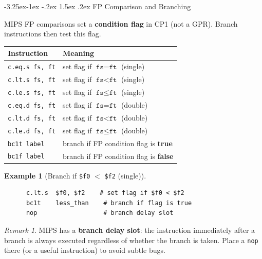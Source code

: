 \documentclass{article}
\makeatletter
\newtheorem{example}{Example}[section]
\theoremstyle{remark}
\newtheorem*{remark}{Remark}
\newlength{\subsecindent}
\renewcommand\subsection{\@startsection{subsection}{2}{\subsecindent}%
  {-3.25ex\@plus -1ex \@minus -.2ex}%
  {1.5ex \@plus .2ex}%
  {\normalfont\large\bfseries}}
\newenvironment{sub}{%
  \begin{list}{}{%
    \setlength{\leftmargin}{4em}%
    \setlength{\rightmargin}{0pt}%
    \setlength{\topsep}{0pt}%
    \setlength{\partopsep}{0pt}%
    \setlength{\parsep}{\parskip}%
    \setlength{\itemsep}{\parskip}%
  }\item\relax
}{\end{list}}
\makeatother
\begin{document}
\subsection{FP Comparison and Branching}
\begin{sub}
MIPS FP comparisons set a \textbf{condition flag} in CP1 (not a GPR).
Branch instructions then test this flag.

\begin{center}
\begin{tabular}{ll}
\toprule
\textbf{Instruction} & \textbf{Meaning} \\
\midrule
\texttt{c.eq.s fs, ft} & set flag if $\texttt{fs} = \texttt{ft}$ (single) \\
\texttt{c.lt.s fs, ft} & set flag if $\texttt{fs} < \texttt{ft}$ (single) \\
\texttt{c.le.s fs, ft} & set flag if $\texttt{fs} \leq \texttt{ft}$ (single) \\
\texttt{c.eq.d fs, ft} & set flag if $\texttt{fs} = \texttt{ft}$ (double) \\
\texttt{c.lt.d fs, ft} & set flag if $\texttt{fs} < \texttt{ft}$ (double) \\
\texttt{c.le.d fs, ft} & set flag if $\texttt{fs} \leq \texttt{ft}$ (double) \\
\midrule
\texttt{bc1t label} & branch if FP condition flag is \textbf{true} \\
\texttt{bc1f label} & branch if FP condition flag is \textbf{false} \\
\bottomrule
\end{tabular}
\end{center}

\begin{example}[Branch if \texttt{\$f0} $<$ \texttt{\$f2} (single)]
\begin{verbatim}
      c.lt.s  $f0, $f2    # set flag if $f0 < $f2
      bc1t    less_than    # branch if flag is true
      nop                  # branch delay slot
\end{verbatim}
\end{example}

\begin{remark}
MIPS has a \textbf{branch delay slot}: the instruction immediately after a
branch is always executed regardless of whether the branch is taken.  Place a
\texttt{nop} there (or a useful instruction) to avoid subtle bugs.
\end{remark}
\end{sub}
\end{document}
